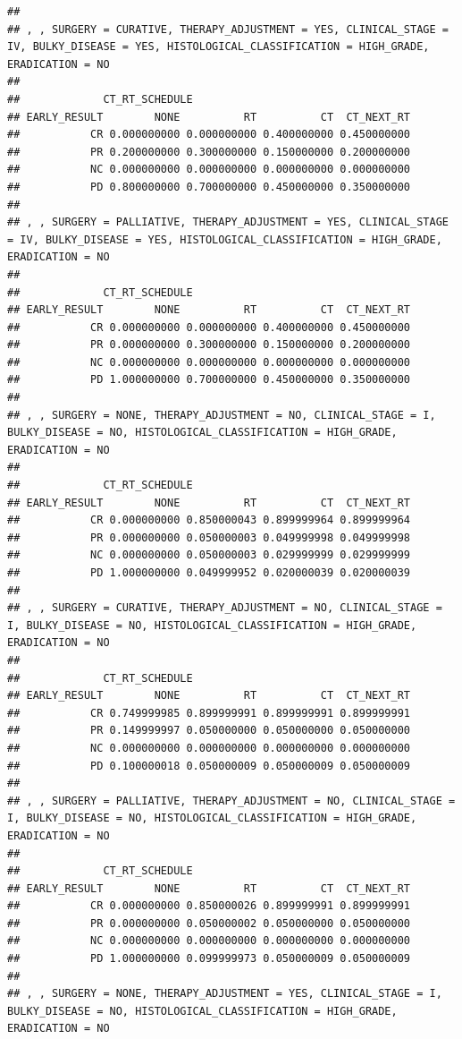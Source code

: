 \documentclass[]{article}
\begin{document}
\begin{verbatim}
## 
## , , SURGERY = CURATIVE, THERAPY_ADJUSTMENT = YES, CLINICAL_STAGE = IV, BULKY_DISEASE = YES, HISTOLOGICAL_CLASSIFICATION = HIGH_GRADE, ERADICATION = NO
## 
##             CT_RT_SCHEDULE
## EARLY_RESULT        NONE          RT          CT  CT_NEXT_RT
##           CR 0.000000000 0.000000000 0.400000000 0.450000000
##           PR 0.200000000 0.300000000 0.150000000 0.200000000
##           NC 0.000000000 0.000000000 0.000000000 0.000000000
##           PD 0.800000000 0.700000000 0.450000000 0.350000000
## 
## , , SURGERY = PALLIATIVE, THERAPY_ADJUSTMENT = YES, CLINICAL_STAGE = IV, BULKY_DISEASE = YES, HISTOLOGICAL_CLASSIFICATION = HIGH_GRADE, ERADICATION = NO
## 
##             CT_RT_SCHEDULE
## EARLY_RESULT        NONE          RT          CT  CT_NEXT_RT
##           CR 0.000000000 0.000000000 0.400000000 0.450000000
##           PR 0.000000000 0.300000000 0.150000000 0.200000000
##           NC 0.000000000 0.000000000 0.000000000 0.000000000
##           PD 1.000000000 0.700000000 0.450000000 0.350000000
## 
## , , SURGERY = NONE, THERAPY_ADJUSTMENT = NO, CLINICAL_STAGE = I, BULKY_DISEASE = NO, HISTOLOGICAL_CLASSIFICATION = HIGH_GRADE, ERADICATION = NO
## 
##             CT_RT_SCHEDULE
## EARLY_RESULT        NONE          RT          CT  CT_NEXT_RT
##           CR 0.000000000 0.850000043 0.899999964 0.899999964
##           PR 0.000000000 0.050000003 0.049999998 0.049999998
##           NC 0.000000000 0.050000003 0.029999999 0.029999999
##           PD 1.000000000 0.049999952 0.020000039 0.020000039
## 
## , , SURGERY = CURATIVE, THERAPY_ADJUSTMENT = NO, CLINICAL_STAGE = I, BULKY_DISEASE = NO, HISTOLOGICAL_CLASSIFICATION = HIGH_GRADE, ERADICATION = NO
## 
##             CT_RT_SCHEDULE
## EARLY_RESULT        NONE          RT          CT  CT_NEXT_RT
##           CR 0.749999985 0.899999991 0.899999991 0.899999991
##           PR 0.149999997 0.050000000 0.050000000 0.050000000
##           NC 0.000000000 0.000000000 0.000000000 0.000000000
##           PD 0.100000018 0.050000009 0.050000009 0.050000009
## 
## , , SURGERY = PALLIATIVE, THERAPY_ADJUSTMENT = NO, CLINICAL_STAGE = I, BULKY_DISEASE = NO, HISTOLOGICAL_CLASSIFICATION = HIGH_GRADE, ERADICATION = NO
## 
##             CT_RT_SCHEDULE
## EARLY_RESULT        NONE          RT          CT  CT_NEXT_RT
##           CR 0.000000000 0.850000026 0.899999991 0.899999991
##           PR 0.000000000 0.050000002 0.050000000 0.050000000
##           NC 0.000000000 0.000000000 0.000000000 0.000000000
##           PD 1.000000000 0.099999973 0.050000009 0.050000009
## 
## , , SURGERY = NONE, THERAPY_ADJUSTMENT = YES, CLINICAL_STAGE = I, BULKY_DISEASE = NO, HISTOLOGICAL_CLASSIFICATION = HIGH_GRADE, ERADICATION = NO

\end{verbatim}
\end{document}
